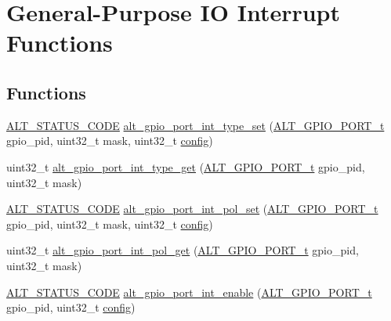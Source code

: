 \hypertarget{group__ALT__GPIO__INT}{}\section{General-\/\+Purpose IO Interrupt Functions}
\label{group__ALT__GPIO__INT}
\subsection*{Functions}
\begin{DoxyCompactItemize}
\item 
\mbox{\hyperlink{hwlib_8h_abdb0d369f069723ca55d6c94bcaaaa12}{A\+L\+T\+\_\+\+S\+T\+A\+T\+U\+S\+\_\+\+C\+O\+DE}} \mbox{\hyperlink{group__ALT__GPIO__INT_ga4d56fea036eb7f0f7d803bfe1659ecc4}{alt\+\_\+gpio\+\_\+port\+\_\+int\+\_\+type\+\_\+set}} (\mbox{\hyperlink{group__ALT__GPIO__API__CONFIG_gaaf1cf0e2a720d20cd883810f2b59097e}{A\+L\+T\+\_\+\+G\+P\+I\+O\+\_\+\+P\+O\+R\+T\+\_\+t}} gpio\+\_\+pid, uint32\+\_\+t mask, uint32\+\_\+t \mbox{\hyperlink{structconfig__s}{config}})
\item 
uint32\+\_\+t \mbox{\hyperlink{group__ALT__GPIO__INT_ga865bcf59622842a164eb2110a63e3fa5}{alt\+\_\+gpio\+\_\+port\+\_\+int\+\_\+type\+\_\+get}} (\mbox{\hyperlink{group__ALT__GPIO__API__CONFIG_gaaf1cf0e2a720d20cd883810f2b59097e}{A\+L\+T\+\_\+\+G\+P\+I\+O\+\_\+\+P\+O\+R\+T\+\_\+t}} gpio\+\_\+pid, uint32\+\_\+t mask)
\item 
\mbox{\hyperlink{hwlib_8h_abdb0d369f069723ca55d6c94bcaaaa12}{A\+L\+T\+\_\+\+S\+T\+A\+T\+U\+S\+\_\+\+C\+O\+DE}} \mbox{\hyperlink{group__ALT__GPIO__INT_gaf4f0c4014e0ffd8dae1a565cb3e90ccc}{alt\+\_\+gpio\+\_\+port\+\_\+int\+\_\+pol\+\_\+set}} (\mbox{\hyperlink{group__ALT__GPIO__API__CONFIG_gaaf1cf0e2a720d20cd883810f2b59097e}{A\+L\+T\+\_\+\+G\+P\+I\+O\+\_\+\+P\+O\+R\+T\+\_\+t}} gpio\+\_\+pid, uint32\+\_\+t mask, uint32\+\_\+t \mbox{\hyperlink{structconfig__s}{config}})
\item 
uint32\+\_\+t \mbox{\hyperlink{group__ALT__GPIO__INT_ga1d81a2952a442d8fa37e7f53ac445633}{alt\+\_\+gpio\+\_\+port\+\_\+int\+\_\+pol\+\_\+get}} (\mbox{\hyperlink{group__ALT__GPIO__API__CONFIG_gaaf1cf0e2a720d20cd883810f2b59097e}{A\+L\+T\+\_\+\+G\+P\+I\+O\+\_\+\+P\+O\+R\+T\+\_\+t}} gpio\+\_\+pid, uint32\+\_\+t mask)
\item 
\mbox{\hyperlink{hwlib_8h_abdb0d369f069723ca55d6c94bcaaaa12}{A\+L\+T\+\_\+\+S\+T\+A\+T\+U\+S\+\_\+\+C\+O\+DE}} \mbox{\hyperlink{group__ALT__GPIO__INT_gab9d4a058575409c93806276f9445b49f}{alt\+\_\+gpio\+\_\+port\+\_\+int\+\_\+enable}} (\mbox{\hyperlink{group__ALT__GPIO__API__CONFIG_gaaf1cf0e2a720d20cd883810f2b59097e}{A\+L\+T\+\_\+\+G\+P\+I\+O\+\_\+\+P\+O\+R\+T\+\_\+t}} gpio\+\_\+pid, uint32\+\_\+t \mbox{\hyperlink{structconfig__s}{config}})

\end{DoxyCompactItemize}
